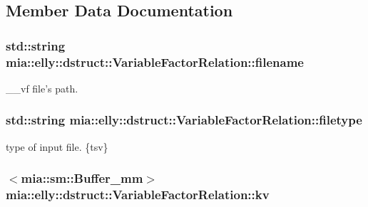 \subsection{Member Data Documentation}
\hypertarget{classmia_1_1elly_1_1dstruct_1_1_variable_factor_relation_a582e0a5fb2699076d5ec719a32613129}{
\subsubsection[{filename}]{\setlength{\rightskip}{0pt plus 5cm}std\-::string mia\-::elly\-::dstruct\-::\-Variable\-Factor\-Relation\-::filename}}\label{classmia_1_1elly_1_1dstruct_1_1_variable_factor_relation_a582e0a5fb2699076d5ec719a32613129}
\-\_\-\-\_\-vf file's path. \hypertarget{classmia_1_1elly_1_1dstruct_1_1_variable_factor_relation_a14811849a23c099c5d1d9abb718f3d9f}{
\subsubsection[{filetype}]{\setlength{\rightskip}{0pt plus 5cm}std\-::string mia\-::elly\-::dstruct\-::\-Variable\-Factor\-Relation\-::filetype}}\label{classmia_1_1elly_1_1dstruct_1_1_variable_factor_relation_a14811849a23c099c5d1d9abb718f3d9f}
type of input file. \{tsv\} \hypertarget{classmia_1_1elly_1_1dstruct_1_1_variable_factor_relation_a6af37ab4f9c3d0217b7f80664a132a48}{
\subsubsection[{kv}]{$<${\bf mia\-::sm\-::\-Buffer\-\_\-mm}$>$ mia\-::elly\-::dstruct\-::\-Variable\-Factor\-Relation\-::kv}}\label{classmia_1_1elly_1_1dstruct_1_1_variable_factor_relation_a6af37ab4f9c3d0217b7f80664a132a48}
